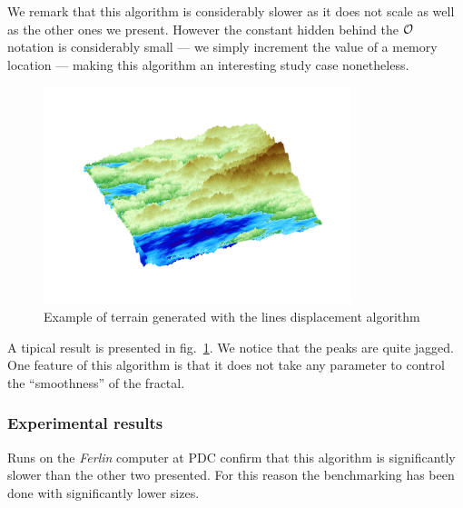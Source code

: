 We remark that this algorithm is considerably slower as it does not scale as well as the other ones we present. However the constant hidden behind the ${\cal O}$ notation is considerably small --- we simply increment the value of a memory location --- making this algorithm  an interesting study case nonetheless.
\begin{figure}[htb]
\centering
    \includegraphics[width=0.8\textwidth]{img/lines3d.png}
    \caption{\label{lines3d}Example of terrain generated with the lines displacement algorithm}
\end{figure}

A tipical result is presented in fig.~\ref{lines3d}. We notice that the peaks are quite jagged. 
One feature of this algorithm is that it does not take any parameter to control the ``smoothness'' of the fractal.

\subsubsection{Experimental results}

Runs on the {\em Ferlin} computer at PDC confirm that this algorithm is significantly slower than the other two presented. For this reason the benchmarking has been done with significantly lower sizes.

